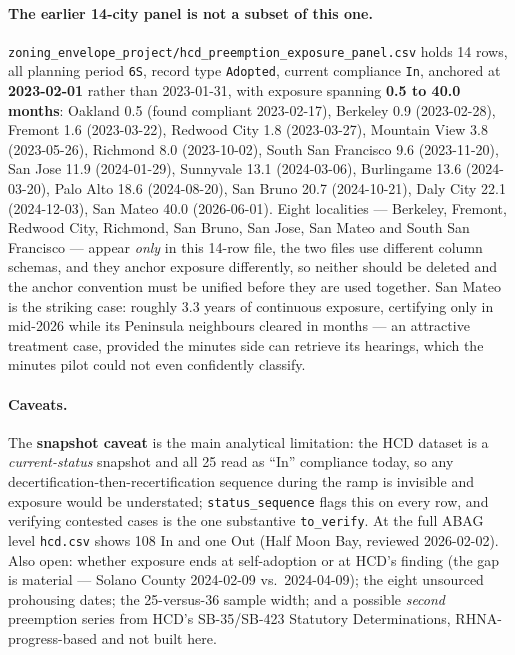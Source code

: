 \documentclass[11pt]{article}
\begin{document}
\paragraph{The earlier 14-city panel is not a subset of this one.}
\texttt{zoning\_envelope\_project/hcd\_preemption\_exposure\_panel.csv} holds 14 rows, all
planning period \texttt{6S}, record type \texttt{Adopted}, current compliance \texttt{In},
anchored at \textbf{2023-02-01} rather than 2023-01-31, with exposure spanning \textbf{0.5 to
40.0 months}: Oakland 0.5 (found compliant 2023-02-17), Berkeley 0.9 (2023-02-28), Fremont 1.6
(2023-03-22), Redwood City 1.8 (2023-03-27), Mountain View 3.8 (2023-05-26), Richmond 8.0
(2023-10-02), South San Francisco 9.6 (2023-11-20), San Jose 11.9 (2024-01-29), Sunnyvale 13.1
(2024-03-06), Burlingame 13.6 (2024-03-20), Palo Alto 18.6 (2024-08-20), San Bruno 20.7
(2024-10-21), Daly City 22.1 (2024-12-03), San Mateo 40.0 (2026-06-01). Eight localities ---
Berkeley, Fremont, Redwood City, Richmond, San Bruno, San Jose, San Mateo and South San Francisco
--- appear \emph{only} in this 14-row file, the two files use different column schemas, and they
anchor exposure differently, so neither should be deleted and the anchor convention must be
unified before they are used together. San Mateo is the striking case: roughly 3.3 years of
continuous exposure, certifying only in mid-2026 while its Peninsula neighbours cleared in months
--- an attractive treatment case, provided the minutes side can retrieve its hearings, which the
minutes pilot could not even confidently classify.

\paragraph{Caveats.} The \textbf{snapshot caveat} is the main analytical limitation: the HCD
dataset is a \emph{current-status} snapshot and all 25 read as ``In'' compliance today, so any
decertification-then-recertification sequence during the ramp is invisible and exposure would be
understated; \texttt{status\_sequence} flags this on every row, and verifying contested cases is
the one substantive \texttt{to\_verify}. At the full ABAG level \texttt{hcd.csv} shows 108 In and
one Out (Half Moon Bay, reviewed 2026-02-02). Also open: whether exposure ends at self-adoption
or at HCD's finding (the gap is material --- Solano County 2024-02-09 vs.\ 2024-04-09); the eight
unsourced prohousing dates; the 25-versus-36 sample width; and a possible \emph{second} preemption
series from HCD's SB-35/SB-423 Statutory Determinations, RHNA-progress-based and not built here.
\end{document}
